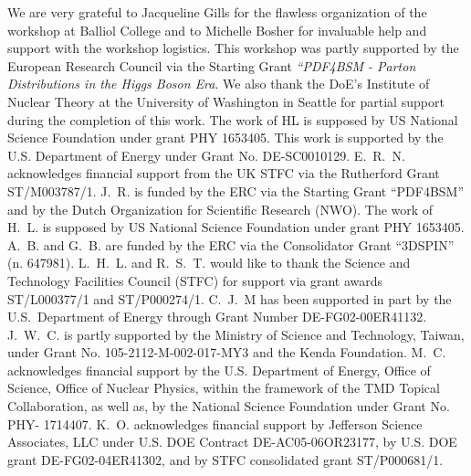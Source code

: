 We are very grateful to Jacqueline Gills for the flawless organization
of the workshop at Balliol College and to Michelle Bosher for
invaluable help and support with the workshop logistics.
%
This workshop was partly supported by the European Research Council via
the Starting Grant {\it ``PDF4BSM - Parton Distributions in the
  Higgs Boson Era}.
%
We also thank the DoE's Institute of Nuclear Theory at the University of Washington
in Seattle for partial support during the completion of this work. 
%
The work of HL is supposed by US National Science Foundation
under grant PHY 1653405.
%
This work is supported by
the U.S. Department of Energy under Grant No. DE-SC0010129.
%
E.~R.~N. acknowledges financial support from the
UK STFC via the Rutherford Grant ST/M003787/1.
%
J.~R. is funded by the ERC via the Starting Grant ``PDF4BSM'' and by the
Dutch Organization for Scientific Research (NWO).
%
The work of H.~L. is supposed by US National Science Foundation under grant PHY 1653405. 
%
A.~B. and G.~B. are funded by the ERC via the Consolidator
Grant “3DSPIN” (n. 647981). 
%
L.~H.~L. and R.~S.~T. would like to thank the Science and Technology Facilities Council
(STFC) for support via grant awards ST/L000377/1 and ST/P000274/1. 
%
C.~J.~M has been supported in part by the U.S.~Department of Energy through
Grant Number DE-FG02-00ER41132.
%
J.~W.~C. is partly supported by the Ministry of Science and Technology, Taiwan,
under Grant No. 105-2112-M-002-017-MY3 and the Kenda Foundation.
%
M.~C. acknowledges financial support by the U.S. Department of Energy, Office of Science, Office of Nuclear Physics, within the framework of the TMD Topical Collaboration, as well as,
by the National Science Foundation under Grant No. PHY- 1714407. 
%
K.~O. 
acknowledges financial support  by Jefferson Science Associates, LLC under U.S. DOE Contract DE-AC05-06OR23177, by U.S. DOE grant DE-FG02-04ER41302, and  by STFC consolidated grant ST/P000681/1.
